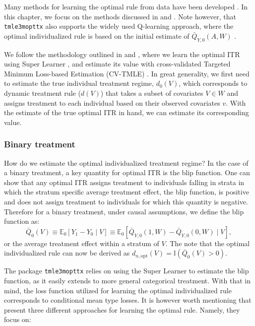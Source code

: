 \documentclass[12pt, krantz2,]{krantz}
\theoremstyle{definition}
\theoremstyle{definition}
\theoremstyle{definition}
\newcommand{\E}{\mathbb{E}}
\newcommand{\1}{\mathbbm{1}}
\begin{document}
Many methods for learning the optimal rule from data have been developed
\citep{murphy2003, robins2004, laber2012, kosorok2012, moodie2013}. In this
chapter, we focus on the methods discussed in \citet{luedtke2016super} and
\citet{vanderLaanLuedtke15}. Note however, that \texttt{tmle3mopttx} also supports the widely
used Q-learning approach, where the optimal individualized rule is based on the
initial estimate of \(\bar{Q}_{Y,0}(A,W)\) \citep{Sutton1998}.

We follow the methodology outlined in \citet{luedtke2016super} and
\citet{vanderLaanLuedtke15}, where we learn the optimal ITR using Super Learner
\citep{vdl2007super}, and estimate its value with cross-validated Targeted Minimum
Loss-based Estimation (CV-TMLE) \citep{cvtmle2010}. In great generality, we first
need to estimate the true individual treatment regime, \(d_0(V)\), which
corresponds to dynamic treatment rule (\(d(V)\)) that takes a subset of covariates
\(V \in W\) and assigns treatment to each individual based on their observed
covariates \(v\). With the estimate of the true optimal ITR in hand, we can
estimate its corresponding value.

\hypertarget{binary-treatment}{%
\subsubsection{Binary treatment}\label{binary-treatment}}

How do we estimate the optimal individualized treatment regime? In the case of a
binary treatment, a key quantity for optimal ITR is the blip function. One can
show that any optimal ITR assigns treatment to individuals falling in strata in
which the stratum specific average treatment effect, the blip function, is
positive and does not assign treatment to individuals for which this quantity is
negative. Therefore for a binary treatment, under causal assumptions, we define
the blip function as:
\[\bar{Q}_0(V) \equiv \E_0[Y_1-Y_0 \mid V] \equiv \E_0[\bar{Q}_{Y,0}(1,W) -
\bar{Q}_{Y,0}(0,W) \mid V],\]
or the average treatment effect within a stratum of \(V\). The note that the
optimal individualized rule can now be derived as \(d_{n,\text{opt}}(V) = \mathbb{I}(\bar{Q}_{0}(V) > 0)\).

The package \texttt{tmle3mopttx} relies on using the Super Learner to estimate the blip
function, as it easily extends to more general categorical treatment. With that
in mind, the loss function utilized for learning the optimal individualized rule
corresponds to conditional mean type losses. It is however worth mentioning that
\citet{luedtke2016super} present three different approaches for learning the optimal
rule. Namely, they focus on:
\end{document}
